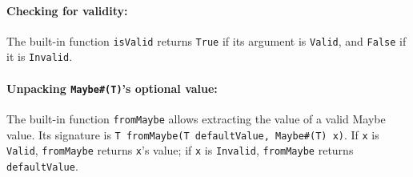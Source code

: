 \paragraph{Checking for validity:}
The built-in function \verb|isValid| returns \verb|True| if its argument is \verb|Valid|,
and \verb|False| if it is \verb|Invalid|.

\paragraph{Unpacking \texttt{Maybe\#(T)}'s optional value:}
The built-in function \verb|fromMaybe| allows extracting the value of a valid Maybe value.
Its signature is 
\verb|T fromMaybe(T defaultValue, Maybe#(T) x)|.
If \verb|x| is \verb|Valid|, \verb|fromMaybe| returns \verb|x|'s value; if \verb|x| is \verb|Invalid|, \verb|fromMaybe| returns \verb|defaultValue|.


